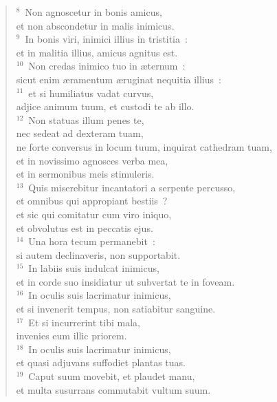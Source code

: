 \begin{verse}${}^{8}$~Non agnoscetur in bonis amicus,\\ et non abscondetur in malis inimicus.\\
${}^{9}$~In bonis viri, inimici illius in tristitia~:\\ et in malitia illius, amicus agnitus est.\\
${}^{10}$~Non credas inimico tuo in \ae ternum~:\\ sicut enim \ae ramentum \ae ruginat nequitia illius~:\\
${}^{11}$~et si humiliatus vadat curvus,\\ adjice animum tuum, et custodi te ab illo.\\
${}^{12}$~Non statuas illum penes te,\\ nec sedeat ad dexteram tuam,\\ ne forte conversus in locum tuum, inquirat cathedram tuam,\\ et in novissimo agnosces verba mea,\\ et in sermonibus meis stimuleris.\\
${}^{13}$~Quis miserebitur incantatori a serpente percusso,\\ et omnibus qui appropiant bestiis~?\\ et sic qui comitatur cum viro iniquo,\\ et obvolutus est in peccatis ejus.\\
${}^{14}$~Una hora tecum permanebit~:\\ si autem declinaveris, non supportabit.\\
${}^{15}$~In labiis suis indulcat inimicus,\\ et in corde suo insidiatur ut subvertat te in foveam.\\
${}^{16}$~In oculis suis lacrimatur inimicus,\\ et si invenerit tempus, non satiabitur sanguine.\\
${}^{17}$~Et si incurrerint tibi mala,\\ invenies eum illic priorem.\\
${}^{18}$~In oculis suis lacrimatur inimicus,\\ et quasi adjuvans suffodiet plantas tuas.\\
${}^{19}$~Caput suum movebit, et plaudet manu,\\ et multa susurrans commutabit vultum suum.\end{verse}


